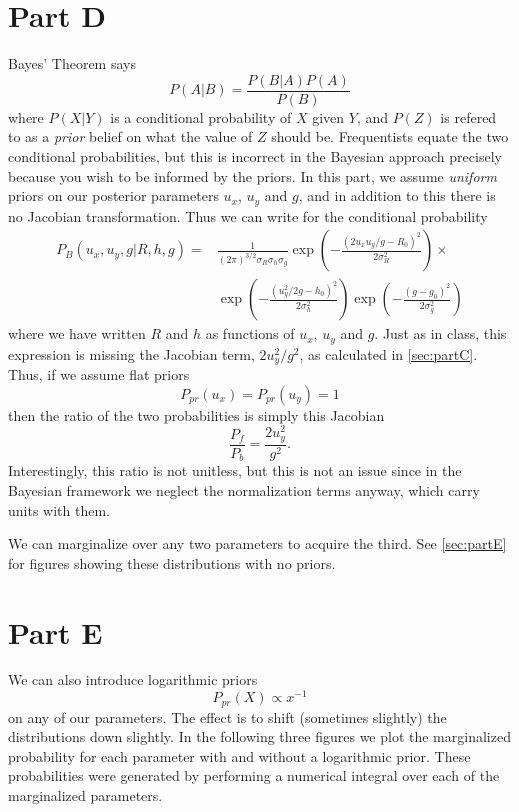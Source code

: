 \documentclass[12pt,a4paper]{article}
\begin{document}
\section{Part D}
\label{sec:partD}
Bayes' Theorem says
\begin{equation}
  P(A|B) = \frac{P(B|A)P(A)}{P(B)}
\end{equation}
where $P(X|Y)$ is a conditional probability of $X$ given $Y$, and $P(Z)$ is 
refered to as a \textit{prior} belief on what the value of $Z$ should be.
Frequentists equate the two conditional probabilities, but this is incorrect
in the Bayesian approach precisely because you wish to be informed by the 
priors. In this part, we assume \textit{uniform} priors on our posterior
parameters $u_x$, $u_y$ and $g$, and in addition to this there is no Jacobian 
transformation. Thus we can write for the conditional probability
\begin{align}
  \label{eq:bayesian_conditional}
  P_B(u_x,u_y,g|R,h,g) = & \frac{1}{(2\pi)^{3/2}\sigma_R\sigma_h\sigma_g} \exp\left(-\frac{(2u_xu_y/g - R_0)^2}{2\sigma_R^2}\right)\times \\ &\exp\left(-\frac{(u_y^2/2g-h_0)^2}{2\sigma_h^2}\right) \exp\left(-\frac{(g-g_0)^2}{2\sigma_g^2}\right)
\end{align}
where we have written $R$ and $h$ as functions of $u_x$, $u_y$ and $g$. Just as in class,
this expression is missing the Jacobian term,
$2u_y^2/g^2$, as calculated in \autoref{sec:partC}. Thus, if we assume flat priors
\begin{equation}
  \label{eq:priors_partD}
  P_{pr}(u_x) = P_{pr}(u_y) = 1
\end{equation}
then the ratio of the two probabilities is simply this Jacobian
\begin{equation}
  \label{eq:prob_ratio}
  \frac{P_f}{P_b} = \frac{2u_y^2}{g^2}.
\end{equation}
Interestingly, this ratio is not unitless, 
but this is not an issue since in the Bayesian 
framework we neglect the normalization terms anyway, 
which carry units with them.

We can marginalize over any two parameters to acquire the third.
See \autoref{sec:partE} for figures showing these distributions 
with no priors.

\section{Part E}
We can also introduce logarithmic priors
\begin{equation*}
  \label{eq:log_prior}
  P_{pr}(X) \propto x^{-1}
\end{equation*}
on any of our parameters. The effect is to shift (sometimes slightly)
the distributions down slightly. In the following three figures
we plot the marginalized probability for each parameter with and 
without a logarithmic prior. These probabilities were generated
by performing a numerical integral over each of the marginalized
parameters.
\end{document}
